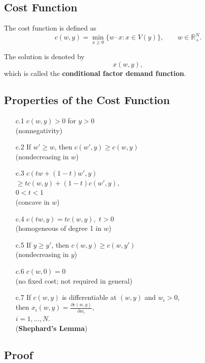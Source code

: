 \subsection{Cost Function}

The cost function is defined as
\[
c(w,y)
=
\min_{x \ge 0} \{ w \cdot x : x \in V(y) \},
\qquad w \in \mathbb{R}^N_+.
\]

The solution is denoted by
\[
x(w,y),
\]
which is called the \textbf{conditional factor demand function}.

\subsection*{Properties of the Cost Function}

\begin{itemize}
    \item[c.1] $c(w,y) > 0$ for $y>0$ \\
    (nonnegativity)

    \item[c.2] If $w' \ge w$, then $c(w',y) \ge c(w,y)$\\
    (nondecreasing in $w$)

    \item[c.3] $c(tw+(1-t)w',y)$\\
    $\ge t c(w,y)+(1-t)c(w',y),$\\
    $0<t<1$\\
    (concave in $w$)

    \item[c.4] $c(tw,y)=t c(w,y),$ $t>0$\\
    (homogeneous of degree 1 in $w$)

    \item[c.5] If $y \ge y'$, then $c(w,y) \ge c(w,y')$\\
    (nondecreasing in $y$)

    \item[c.6] $c(w,0)=0$\\
    (no fixed cost; not required in general)

    \item[c.7] If $c(w,y)$ is differentiable at $(w,y)$ and $w_i>0$,\\
    then $x_i(w,y)=\frac{\partial c(w,y)}{\partial w_i}, $\\
    $i=1,\dots,N.$\\
    (\textbf{Shephard’s Lemma})
\end{itemize}

\subsection*{Proof}

